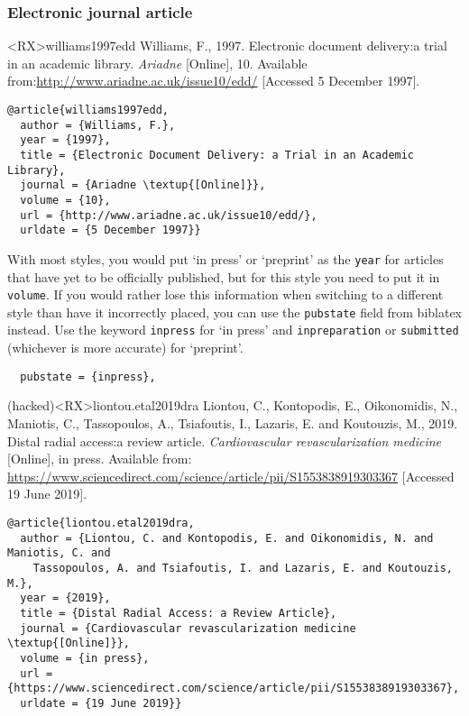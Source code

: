 \documentclass[10pt,a4paper]{article}
\newenvironment{hacks}{%
  \begin{list}{\makebox[2em][c]{\faWrench}}{%
    \setlength{\leftmargin}{2em}
    \setlength{\labelwidth}{2em}
    \setlength{\labelsep}{0pt}}
}{\end{list}}
\begin{document}
\subsubsection*{Electronic journal article}

\begin{bibexbox}<RX>{williams1997edd}
  Williams, F., 1997. Electronic document delivery:\@ a trial in an academic library. \emph{Ariadne} [Online], 10. Available from:\@ \url{http://www.ariadne.ac.uk/issue10/edd/} [Accessed 5 December 1997].
  \tcblower
\begin{Verbatim}
@article{williams1997edd,
  author = {Williams, F.},
  year = {1997},
  title = {Electronic Document Delivery: a Trial in an Academic Library},
  journal = {Ariadne \textup{[Online]}},
  volume = {10},
  url = {http://www.ariadne.ac.uk/issue10/edd/},
  urldate = {5 December 1997}}
\end{Verbatim}
\end{bibexbox}

\begin{hacks}
\item With most styles, you would put `in press' or `preprint' as the
  \texttt{year} for articles that have yet to be officially published, but for
  this style you need to put it in \texttt{volume}. If you would rather lose
  this information when switching to a different style than have it incorrectly
  placed, you can use the \texttt{pubstate} field from \textsf{biblatex}
  instead. Use the keyword \texttt{inpress} for `in press' and
  \texttt{inpreparation} or \texttt{submitted} (whichever is more accurate) for
  `preprint'.

\begin{tcolorbox}%
  [ colframe = Slate
  , colback = white
  , fontupper = \footnotesize
  ]
  \begin{Verbatim}
  pubstate = {inpress},
  \end{Verbatim}
\end{tcolorbox}
\end{hacks}

\begin{bibexbox}(hacked)<RX>{liontou.etal2019dra}
  Liontou, C., Kontopodis, E., Oikonomidis, N., Maniotis, C., Tassopoulos, A., Tsiafoutis, I., Lazaris, E. and Koutouzis, M., 2019. Distal radial access:\@ a review article. \emph{Cardiovascular revascularization medicine} [Online], in press. Available from: \url{https://www.sciencedirect.com/science/article/pii/S1553838919303367} [Accessed 19 June 2019].
  \tcblower
\begin{Verbatim}
@article{liontou.etal2019dra,
  author = {Liontou, C. and Kontopodis, E. and Oikonomidis, N. and Maniotis, C. and
    Tassopoulos, A. and Tsiafoutis, I. and Lazaris, E. and Koutouzis, M.},
  year = {2019},
  title = {Distal Radial Access: a Review Article},
  journal = {Cardiovascular revascularization medicine \textup{[Online]}},
  volume = {in press},
  url = {https://www.sciencedirect.com/science/article/pii/S1553838919303367},
  urldate = {19 June 2019}}
\end{Verbatim}
\end{bibexbox}
\end{document}
